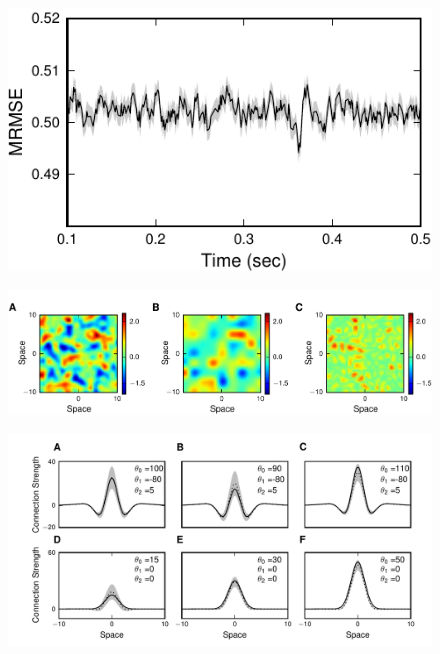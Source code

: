 \documentclass[5p,authoryear]{elsarticle}
\begin{document}
\clearpage
\newpage
\begin{figure}[!ht]
\begin{center}
\includegraphics{./Graph/pdf/fig8.pdf} 
\end{center}
\caption{} 
\label{fig:Figure8}
\end{figure}
\clearpage
\newpage
\begin{figure}[!ht]
\begin{center}
\includegraphics{./Graph/pdf/fig9.pdf}
\end{center}
\caption{}
\label{fig:Figure9}
\end{figure}
\clearpage
\newpage
\begin{figure}[!ht]
\begin{center}
\includegraphics{./Graph/pdf/fig10.pdf}
\end{center}
\caption{}
\label{fig:Figure10}
\end{figure}
\end{document}
